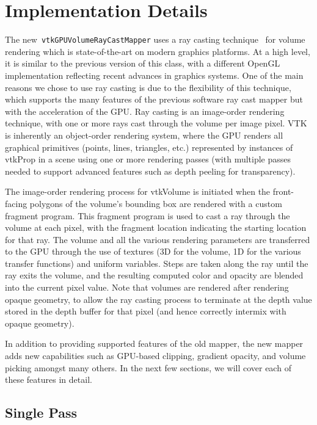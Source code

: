 \section{Implementation Details}
\label{implementationdetails}
The new~\texttt{vtkGPUVolumeRayCastMapper} uses a ray casting
technique~\citep{engel_real-time_2006} for volume rendering which is
state-of-the-art on modern graphics platforms. At a high level, it is similar to
the previous version of this class, with a different OpenGL implementation
reflecting recent advances in graphics systems. One of the main reasons we chose
to use ray casting is due to the flexibility of this technique, which supports
the many features of the previous software ray cast mapper but with the
acceleration of the GPU. Ray casting is an image-order rendering technique, with
one or more rays cast through the volume per image pixel. VTK is inherently an
object-order rendering system, where the GPU renders all graphical primitives
(points, lines, triangles, etc.) represented by instances of vtkProp in a scene
using one or more rendering passes (with multiple passes needed to support
advanced features such as depth peeling for transparency).

The image-order rendering process for vtkVolume is initiated when the
front-facing polygons of the volume’s bounding box are rendered with a custom
fragment program. This fragment program is used to cast a ray through the volume
at each pixel, with the fragment location indicating the starting location for
that ray. The volume and all the various rendering parameters are transferred to
the GPU through the use of textures (3D for the volume, 1D for the various
transfer functions) and uniform variables. Steps are taken along the ray until
the ray exits the volume, and the resulting computed color and opacity are
blended into the current pixel value. Note that volumes are rendered after
rendering opaque geometry, to allow the ray casting process to terminate at the
depth value stored in the depth buffer for that pixel (and hence correctly
intermix with opaque geometry).

In addition to providing supported features of the old mapper, the new mapper
adds new capabilities such as GPU-based clipping,  gradient opacity, and volume
picking amongst many others. In the next few sections, we will cover each of
these features in detail.

\subsection{Single Pass}


